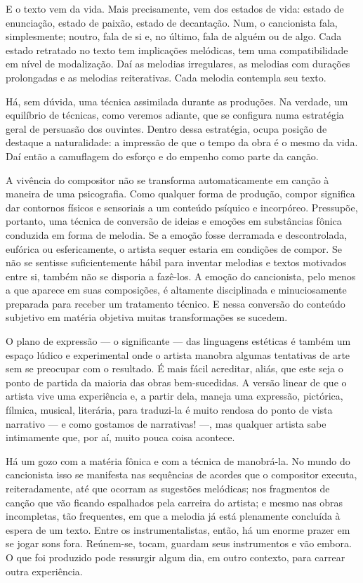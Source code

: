 E o texto vem da vida. Mais precisamente, vem dos estados de vida:
estado de enunciação, estado de paixão, estado de decantação. Num, o
cancionista fala, simplesmente; noutro, fala de si e, no último, fala de
alguém ou de algo. Cada estado retratado no texto tem implicações
melódicas, tem uma compatibilidade em nível de modalização. Daí as
melodias irregulares, as melodias com durações prolongadas e as melodias
reiterativas. Cada melodia contempla seu texto.

Há, sem dúvida, uma técnica assimilada durante as produções. Na verdade,
um equilíbrio de técnicas, como veremos adiante, que se configura numa
estratégia geral de persuasão dos ouvintes. Dentro dessa estratégia,
ocupa posição de destaque a naturalidade: a impressão de que o tempo da
obra é o mesmo da vida. Daí então a camuflagem do esforço e do empenho
como parte da canção.

A vivência do compositor não se transforma automaticamente em canção à
maneira de uma psicografia. Como qualquer forma de produção, compor
significa dar contornos físicos e sensoriais a um conteúdo psíquico e
incorpóreo. Pressupõe, portanto, uma técnica de conversão de ideias e
emoções em substâncias fônica conduzida em forma de melodia. Se a emoção
fosse derramada e descontrolada, eufórica ou esfericamente, o artista
sequer estaria em condições de compor. Se não se sentisse
suficientemente hábil para inventar melodias e textos motivados entre
si, também não se disporia a fazê-los. A emoção do cancionista, pelo
menos a que aparece em suas composições, é altamente disciplinada e
minuciosamente preparada para receber um tratamento técnico. E nessa
conversão do conteúdo subjetivo em matéria objetiva muitas
transformações se sucedem.

O plano de expressão --- o significante --- das linguagens estéticas é também
um espaço lúdico e experimental onde o artista manobra algumas
tentativas de arte sem se preocupar com o resultado. É mais fácil
acreditar, aliás, que este seja o ponto de partida da maioria das obras
bem-sucedidas. A versão linear de que o artista vive uma experiência e,
a partir dela, maneja uma expressão, pictórica, fílmica, musical,
literária, para traduzi-la é muito rendosa do ponto de vista narrativo
 --- e como gostamos de narrativas! ---, mas qualquer artista sabe intimamente
que, por aí, muito pouca coisa acontece.

Há um gozo com a matéria fônica e com a técnica de manobrá-la. No mundo
do cancionista isso se manifesta nas sequências de acordes que o
compositor executa, reiteradamente, até que ocorram as sugestões
melódicas; nos fragmentos de canção que vão ficando espalhados pela
carreira do artista; e mesmo nas obras incompletas, tão frequentes, em
que a melodia já está plenamente concluída à espera de um texto. Entre
os instrumentalistas, então, há um enorme prazer em se jogar sons fora.
Reúnem-se, tocam, guardam seus instrumentos e vão embora. O que foi
produzido pode ressurgir algum dia, em outro contexto, para carrear
outra experiência.

